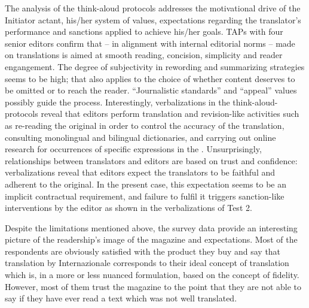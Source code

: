 \documentclass[output=paper]{LSP/langsci}
\begin{document}
The analysis of the think-aloud protocols addresses the motivational drive of the Initiator actant, his/her system of values, expectations regarding the translator's performance and sanctions applied to achieve his/her goals. TAPs with four senior editors confirm that -- in alignment with internal editorial norms --  made on translations is aimed at smooth reading, concision, simplicity and reader engangement. The degree of subjectivity in rewording and summarizing strategies seems to be high; that also applies to the choice of whether content deserves to be omitted or to reach the reader. ``Journalistic standards'' and ``appeal'' values possibly guide the  process. Interestingly, verbalizations in the think-aloud-protocols reveal that editors perform translation and revision-like activities such as re-reading the original in order to control the accuracy of the translation, consulting monolingual and bilingual dictionaries, and carrying out online research for occurrences of specific expressions in the . Unsurprisingly, relationships between translators and editors are based on trust and confidence: verbalizations reveal that editors expect the translators to be faithful and adherent to the original. In the present case, this expectation seems to be an implicit contractual requirement, and failure to fulfil it triggers sanction-like interventions by the editor as shown in the verbalizations of Test 2. 

Despite the limitations mentioned above, the survey data provide an interesting picture of the readership's image of the magazine and expectations. Most of the respondents are obviously satisfied with the product they buy and say that translation by Internazionale corresponds to their ideal concept of translation which is, in a more or less nuanced formulation, based on the concept of fidelity. However, most of them trust the magazine to the point that they are not able to say if they have ever read a text which was not well %
translated. 
\end{document}

